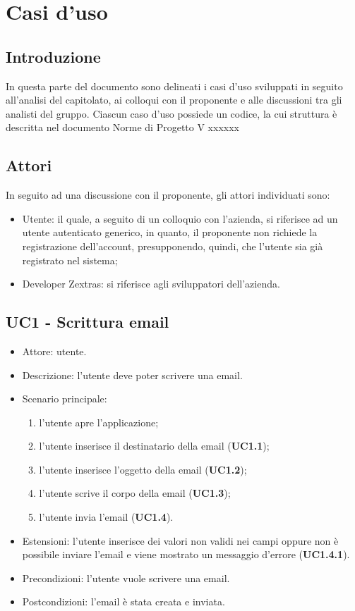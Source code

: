 \section{Casi d'uso}
    \subsection{Introduzione}
    In questa parte del documento sono delineati i casi d'uso sviluppati in seguito all'analisi del capitolato, ai colloqui con il proponente e alle discussioni tra gli analisti del gruppo.
    Ciascun caso d’uso possiede un codice, la cui struttura è descritta nel documento Norme di Progetto V xxxxxx
    \subsection{Attori}
    In seguito ad una discussione con il proponente, gli attori individuati sono:
    \begin{itemize}
        \item Utente: il quale, a seguito di un colloquio con l'azienda, si riferisce ad un utente autenticato generico, in quanto, il proponente
        non richiede la registrazione dell'account, presupponendo, quindi, che l'utente sia già registrato nel sistema;
        \item Developer Zextras: si riferisce agli sviluppatori dell'azienda.
    \end{itemize}

    \subsection{UC1 - Scrittura email}
    \begin{itemize}
        \item Attore: utente.
        \item Descrizione: l'utente deve poter scrivere una email.
        \item Scenario principale:
            \begin{enumerate}
            \item l’utente apre l’applicazione;
            \item l'utente inserisce il destinatario della email (\textbf{UC1.1});
            \item l'utente inserisce l'oggetto della email (\textbf{UC1.2});
            \item l’utente scrive il corpo della email (\textbf{UC1.3});
            \item l’utente invia l'email (\textbf{UC1.4}).
            \end{enumerate}
        \item Estensioni: l'utente inserisce dei valori non validi nei campi oppure non è possibile inviare l'email e viene mostrato un messaggio d'errore (\textbf{UC1.4.1}).
        \item Precondizioni: l'utente vuole scrivere una email.
        \item Postcondizioni: l'email è stata creata e inviata.
    \end{itemize}

